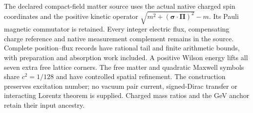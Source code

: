 The declared compact-field matter source uses the actual native charged
spin coordinates and the positive kinetic operator
$\sqrt{m^2+(\boldsymbol\sigma\cdot\boldsymbol\Pi)^2}-m$.
Its Pauli magnetic commutator is retained. Every integer electric flux,
compensating charge reference and native measurement complement remains in
the source. Complete position--flux records have rational tail and finite
arithmetic bounds, with preparation and absorption work included.
A positive Wilson energy lifts all seven extra free lattice corners.
The free matter and quadratic Maxwell symbols share $c^2=1/128$ and have
controlled spatial refinement. The construction preserves excitation number;
no vacuum pair current, signed-Dirac transfer or interacting Lorentz theorem
is supplied. Charged mass ratios and the GeV anchor retain their input ancestry.
